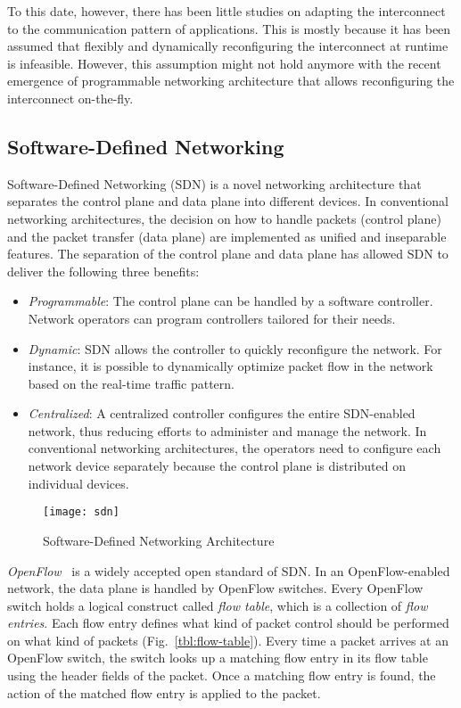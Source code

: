 To this date, however, there has been little studies on adapting the
interconnect to the communication pattern of applications. This is mostly
because it has been assumed that flexibly and dynamically reconfiguring the
interconnect at runtime is infeasible. However, this assumption might not hold
anymore with the recent emergence of programmable networking architecture that
allows reconfiguring the interconnect on-the-fly.

\subsection{Software-Defined Networking}

Software-Defined Networking (SDN) is a novel networking architecture
that separates the control plane and data plane into different devices.
In conventional networking architectures, the decision on how to handle
packets (control plane) and the packet transfer (data plane) are
implemented as unified and inseparable features. The separation of the
control plane and data plane has allowed SDN to deliver the following
three benefits:

\begin{itemize}
\item
  \emph{Programmable}: The control plane can be handled by a software
  controller. Network operators can program controllers tailored for
  their needs.
\item
  \emph{Dynamic}: SDN allows the controller to quickly reconfigure the
  network. For instance, it is possible to dynamically optimize packet
  flow in the network based on the real-time traffic pattern.
\item
  \emph{Centralized}: A centralized controller configures the entire
  SDN-enabled network, thus reducing efforts to administer and manage
  the network. In conventional networking architectures, the operators
  need to configure each network device separately because the control
  plane is distributed on individual devices.
\end{itemize}

\begin{figure}
    \centering
    \texttt{[image: sdn]}
    \caption{Software-Defined Networking Architecture}%
    \label{fig:sdn-architecture}
\end{figure}

\emph{OpenFlow}~\autocite{McKeown2008} is a widely accepted open
standard of SDN\@. In an OpenFlow-enabled network, the data plane is
handled by OpenFlow switches. Every OpenFlow switch holds a logical
construct called \emph{flow table}, which is a collection of \emph{flow
entries}. Each flow entry defines what kind of packet control should be
performed on what kind of packets (Fig.~\ref{tbl:flow-table}). Every
time a packet arrives at an OpenFlow switch, the switch looks up a
matching flow entry in its flow table using the header fields of the
packet. Once a matching flow entry is found, the action of the matched
flow entry is applied to the packet.

